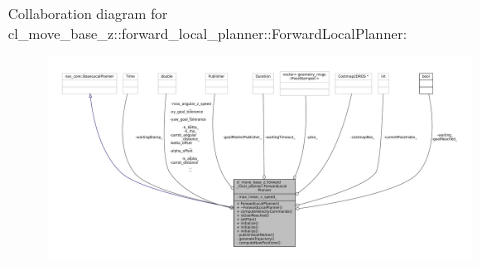 Collaboration diagram for cl\+\_\+move\+\_\+base\+\_\+z\+:\+:forward\+\_\+local\+\_\+planner\+:\+:Forward\+Local\+Planner\+:
\nopagebreak
\begin{figure}[H]
\begin{center}
\leavevmode
\includegraphics[width=350pt]{classcl__move__base__z_1_1forward__local__planner_1_1ForwardLocalPlanner__coll__graph}
\end{center}
\end{figure}
